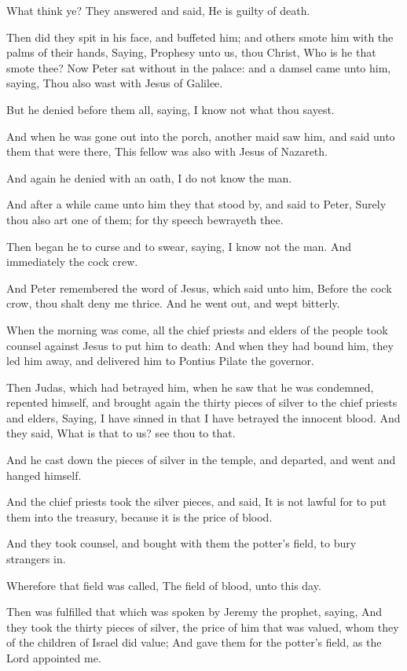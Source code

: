 \Verse What think ye? They answered and said, He is guilty of death.

\Verse Then did they spit in his face, and buffeted him; and others smote him with the palms of their hands, \Verse Saying, Prophesy unto us, thou Christ, Who is he that smote thee?  \Verse Now Peter sat without in the palace: and a damsel came unto him, saying, Thou also wast with Jesus of Galilee.

\Verse But he denied before them all, saying, I know not what thou sayest.

\Verse And when he was gone out into the porch, another maid saw him, and said unto them that were there, This fellow was also with Jesus of Nazareth.

\Verse And again he denied with an oath, I do not know the man.

\Verse And after a while came unto him they that stood by, and said to Peter, Surely thou also art one of them; for thy speech bewrayeth thee.

\Verse Then began he to curse and to swear, saying, I know not the man.  And immediately the cock crew.

\Verse And Peter remembered the word of Jesus, which said unto him, Before the cock crow, thou shalt deny me thrice. And he went out, and wept bitterly.


\Chapter
\Verse When the morning was come, all the chief priests and elders of the people took counsel against Jesus to put him to death: \Verse And when they had bound him, they led him away, and delivered him to Pontius Pilate the governor.

\Verse Then Judas, which had betrayed him, when he saw that he was condemned, repented himself, and brought again the thirty pieces of silver to the chief priests and elders, \Verse Saying, I have sinned in that I have betrayed the innocent blood. And they said, What is that to us? see thou to that.

\Verse And he cast down the pieces of silver in the temple, and departed, and went and hanged himself.

\Verse And the chief priests took the silver pieces, and said, It is not lawful for to put them into the treasury, because it is the price of blood.

\Verse And they took counsel, and bought with them the potter's field, to bury strangers in.

\Verse Wherefore that field was called, The field of blood, unto this day.

\Verse Then was fulfilled that which was spoken by Jeremy the prophet, saying, And they took the thirty pieces of silver, the price of him that was valued, whom they of the children of Israel did value; \Verse And gave them for the potter's field, as the Lord appointed me.

